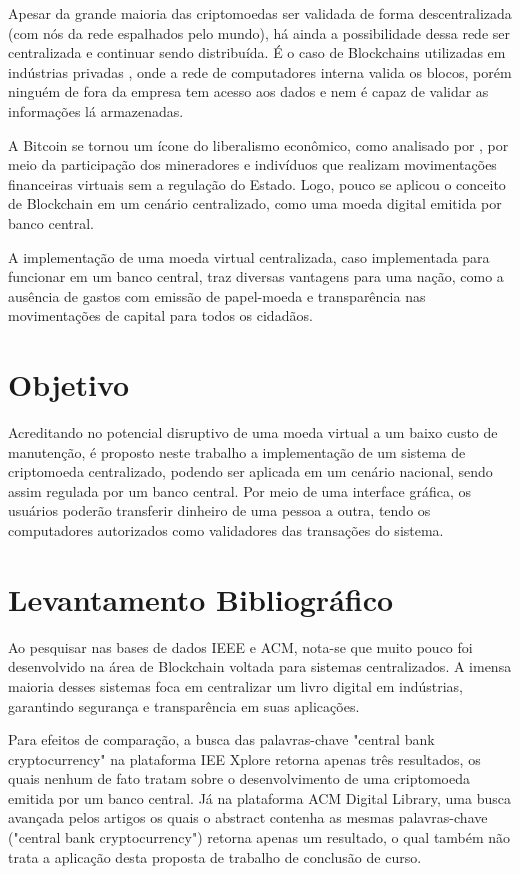 \documentclass[openright]{normas-utf-tex} %
\begin{document}
Apesar da grande maioria das criptomoedas ser validada de forma descentralizada (com nós da rede espalhados pelo mundo), há ainda a possibilidade dessa rede ser centralizada e continuar sendo distribuída. É o caso de Blockchains utilizadas em indústrias privadas \cite{Li2017}, onde a rede de computadores interna valida os blocos, porém ninguém de fora da empresa tem acesso aos dados e nem é capaz de validar as informações lá armazenadas. 

A Bitcoin se tornou um ícone do liberalismo econômico, como analisado por , por meio da participação dos mineradores e indivíduos que realizam movimentações financeiras virtuais sem a regulação do Estado. Logo, pouco se aplicou o conceito de Blockchain em um cenário centralizado, como uma moeda digital emitida por banco central.

A implementação de uma moeda virtual centralizada, caso implementada para funcionar em um banco central, traz diversas vantagens para uma nação, como a ausência de gastos com emissão de papel-moeda e transparência nas movimentações de capital para todos os cidadãos.

\section{Objetivo}

Acreditando no potencial disruptivo de uma moeda virtual a um baixo custo de manutenção, é proposto neste trabalho a implementação de um sistema de criptomoeda centralizado, podendo ser aplicada em um cenário nacional, sendo assim regulada por um banco central. Por meio de uma interface gráfica, os usuários poderão transferir dinheiro de uma pessoa a outra, tendo os computadores autorizados como validadores das transações do sistema.

\section{Levantamento Bibliográfico}

Ao pesquisar nas bases de dados IEEE e ACM, nota-se que muito pouco foi desenvolvido na área de Blockchain voltada para sistemas centralizados. A imensa maioria desses sistemas foca em centralizar um livro digital em indústrias, garantindo segurança e transparência em suas aplicações.

Para efeitos de comparação, a busca das palavras-chave "central bank cryptocurrency" na plataforma IEE Xplore retorna apenas três resultados, os quais nenhum de fato tratam sobre o desenvolvimento de uma criptomoeda emitida por um banco central. Já na plataforma ACM Digital Library, uma busca avançada pelos artigos os quais o abstract contenha as mesmas palavras-chave ("central bank cryptocurrency") retorna apenas um resultado, o qual também não trata a aplicação desta proposta de trabalho de conclusão de curso.
\end{document}
